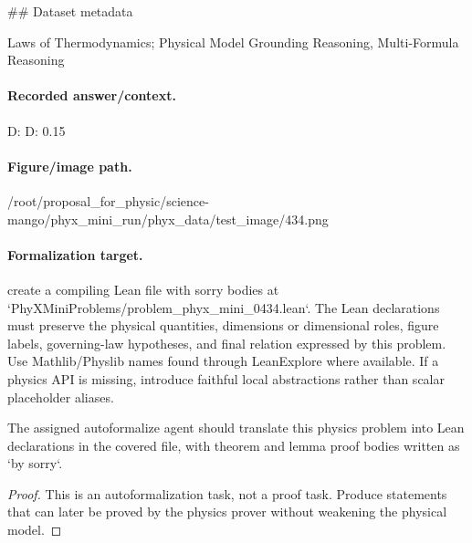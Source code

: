\#\# Dataset metadata

Laws of Thermodynamics; Physical Model Grounding Reasoning, Multi-Formula Reasoning

\paragraph{Recorded answer/context.}
D: D: 0.15

\paragraph{Figure/image path.}
/root/proposal\_for\_physic/science-mango/phyx\_mini\_run/phyx\_data/test\_image/434.png

\paragraph{Formalization target.}
create a compiling Lean file with sorry bodies at `PhyXMiniProblems/problem\_phyx\_mini\_0434.lean`. The Lean declarations must preserve the physical quantities, dimensions or dimensional roles, figure labels, governing-law hypotheses, and final relation expressed by this problem.
Use Mathlib/Physlib names found through LeanExplore where available. If a physics API is missing, introduce faithful local abstractions rather than scalar placeholder aliases.

\begin{theorem}
\label{thm:physics:phyx_mini_0434:target}
The assigned autoformalize agent should translate this physics problem into Lean declarations in the covered file, with theorem and lemma proof bodies written as `by sorry`.
\end{theorem}
\begin{proof}
This is an autoformalization task, not a proof task. Produce statements that can later be proved by the physics prover without weakening the physical model.
\end{proof}

